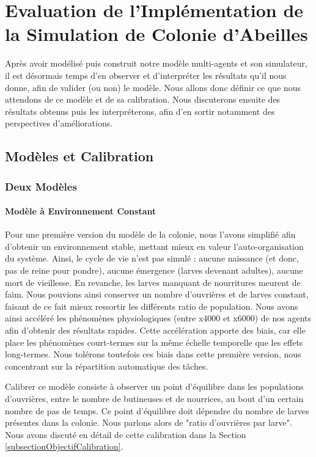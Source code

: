 \chapter{Evaluation de l'Implémentation de la Simulation de Colonie d'Abeilles}
\label{ChapitreEvalSMA}
	Après avoir modélisé puis construit notre modèle multi-agents et son simulateur, il est désormais temps d'en observer et d'interpréter les résultats qu'il nous donne, afin de valider (ou non) le modèle. Nous allons donc définir ce que nous attendons de ce modèle et de sa calibration. Nous discuterons ensuite des résultats obtenus puis les interpréterons, afin d'en sortir notamment des perspectives d'améliorations.
	
	
	\section{Modèles et Calibration}
		\subsection{Deux Modèles}
			\subsubsection{Modèle à Environnement Constant}
			Pour une première version du modèle de la colonie, nous l'avons simplifié afin d'obtenir un environnement stable, mettant mieux en valeur l'auto-organisation du système. Ainsi, le cycle de vie n'est pas simulé : aucune naissance (et donc, pas de reine pour pondre), aucune émergence (larves devenant adultes), aucune mort de vieillesse. En revanche, les larves manquant de nourritures meurent de faim. Nous pouvions ainsi conserver un nombre d'ouvrières et de larves constant, faisant de ce fait mieux ressortir les différents ratio de population. Nous avons ainsi accéléré les phénomènes physiologiques (entre x4000 et x6000) de nos agents afin d'obtenir des résultats rapides. Cette accélération apporte des biais, car elle place les phénomènes court-termes sur la même échelle temporelle que les effets long-termes. Nous tolérons toutefois ces biais dans cette première version, nous concentrant sur la répartition automatique des tâches. 
			
			Calibrer ce modèle consiste à observer un point d'équilibre dans les populations d'ouvrières, entre le nombre de butineuses et de nourrices, au bout d'un certain nombre de pas de temps. Ce point d'équilibre doit dépendre du nombre de larves présentes dans la colonie. Nous parlons alors de "ratio d'ouvrières par larve". Nous avons discuté en détail de cette calibration dans la Section \ref{subsectionObjectifCalibration}.
			

